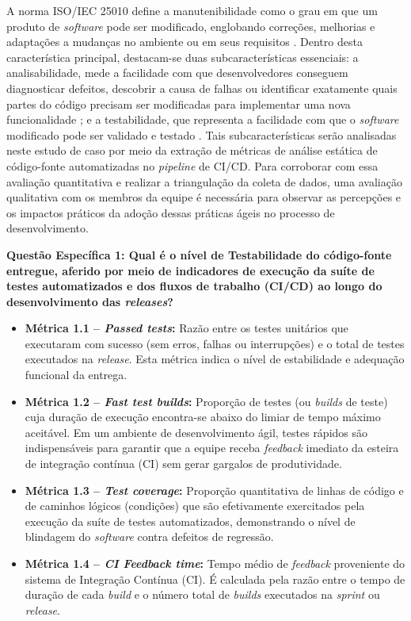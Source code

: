 A norma ISO/IEC 25010 define a manutenibilidade como o grau em que um produto de \textit{software} pode ser modificado, englobando correções, melhorias e adaptações a mudanças no ambiente ou em seus requisitos \cite{iso25010}. Dentro desta característica principal, destacam-se duas subcaracterísticas essenciais: a analisabilidade, mede a facilidade com que desenvolvedores conseguem diagnosticar defeitos, descobrir a causa de falhas ou identificar exatamente quais partes do código precisam ser modificadas para implementar uma nova funcionalidade \cite{iso25010}; e a testabilidade, que representa a facilidade com que o \textit{software} modificado pode ser validado e testado \cite{iso25010}. Tais subcaracterísticas serão analisadas neste estudo de caso por meio da extração de métricas de análise estática de código-fonte automatizadas no \textit{pipeline} de CI/CD. Para corroborar com essa avaliação quantitativa e realizar a triangulação da coleta de dados, uma avaliação qualitativa com os membros da equipe é necessária para observar as percepções e os impactos práticos da adoção dessas práticas ágeis no processo de desenvolvimento.


\vspace{0.5cm}
\noindent \textbf{Questão Específica 1: Qual é o nível de Testabilidade do código-fonte entregue, aferido por meio de indicadores de execução da suíte de testes automatizados e dos fluxos de trabalho (CI/CD) ao longo do desenvolvimento das \textit{releases}?}

\begin{itemize}
    \item \textbf{Métrica 1.1 -- \textit{Passed tests}:} Razão entre os testes unitários que executaram com sucesso (sem erros, falhas ou interrupções) e o total de testes executados na \textit{release}. Esta métrica indica o nível de estabilidade e adequação funcional da entrega. \cite{qrapids2019}
    
    \item \textbf{Métrica 1.2 -- \textit{Fast test builds}:} Proporção de testes (ou \textit{builds} de teste) cuja duração de execução encontra-se abaixo do limiar de tempo máximo aceitável. Em um ambiente de desenvolvimento ágil, testes rápidos são indispensáveis para garantir que a equipe receba \textit{feedback} imediato da esteira de integração contínua (CI) sem gerar gargalos de produtividade. \cite{qrapids2019}
    
    \item \textbf{Métrica 1.3 -- \textit{Test coverage}:} Proporção quantitativa de linhas de código e de caminhos lógicos (condições) que são efetivamente exercitados pela execução da suíte de testes automatizados, demonstrando o nível de blindagem do \textit{software} contra defeitos de regressão. \cite{qrapids2019}
    
    \item \textbf{Métrica 1.4 -- \textit{CI Feedback time}:} Tempo médio de \textit{feedback} proveniente do sistema de Integração Contínua (CI). É calculada pela razão entre o tempo de duração de cada \textit{build} e o número total de \textit{builds} executados na \textit{sprint} ou \textit{release}. \cite{qrapids2019}
\end{itemize}

